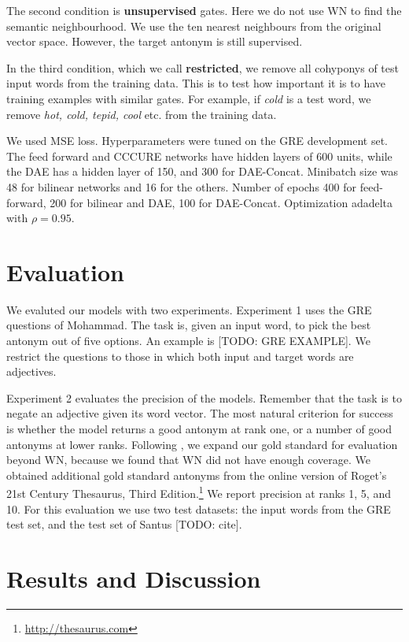 \documentclass[11pt]{article}
\begin{document}
The second condition is {\bf unsupervised} gates. Here we do not use WN to find the semantic neighbourhood. We use the ten nearest neighbours from the original vector space. However, the target antonym is still supervised.

In the third condition, which we call {\bf restricted}, we remove all cohyponys of test input words from the training data. This is to test how important it is to have training examples with similar gates. For example, if {\it cold} is a test word, we remove {\it hot, cold, tepid, cool} etc. from the training data.

We used MSE loss. Hyperparameters were tuned on the GRE development set. The feed forward and CCCURE networks have hidden layers of 600 units, while the DAE has a hidden layer of 150, and 300 for DAE-Concat. Minibatch size was 48 for bilinear networks and 16 for the others. Number of epochs 400 for feed-forward, 200 for bilinear and DAE, 100 for DAE-Concat. Optimization adadelta with $\rho = 0.95$.

\section{Evaluation}

We evaluted our models with two experiments. Experiment 1 uses the GRE questions of Mohammad. The task is, given an input word, to pick the best antonym out of five options. An example is [TODO: GRE EXAMPLE]. We restrict the questions to those in which both input and target words are adjectives.

Experiment 2 evaluates the precision of the models. Remember that the task is to negate an adjective given its word vector. The most natural criterion for success is whether the model returns a good antonym at rank one, or a number of good antonyms at lower ranks. Following \cite{gorman:05}, we expand our gold standard for evaluation beyond WN, because we found that WN did not have enough coverage. We obtained additional gold standard antonyms from the online version of Roget's 21st Century Thesaurus, Third Edition.\footnote{\url{http://thesaurus.com}} We report precision at ranks 1, 5, and 10. For this evaluation we use two test datasets: the input words from the GRE test set, and the test set of Santus [TODO: cite].

\section{Results and Discussion}
\end{document}
